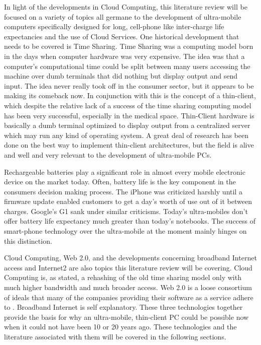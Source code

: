 \documentclass[12pt,oneside,letterpaper,titlepage]{report}
\begin{document}
In light of the developments in Cloud Computing, this literature review will be
focused on a variety of topics all germane to the development of ultra-mobile
computers specifically designed for long, cell-phone like inter-charge life
expectancies and the use of Cloud Services.  One historical development that
needs to be covered is Time Sharing.  Time Sharing was a computing model born in
the days when computer hardware was very expensive.  The idea was that a
computer's computational time could be split between many users accessing the
machine over dumb terminals that did nothing but display output and send input.
The idea never really took off in the consumer sector, but it appears to be
making its comeback now.  In conjunction with this is the concept of a
thin-client, which despite the relative lack of a success of the time sharing
computing model has been very successful, especially in the medical space.
Thin-Client hardware is basically a dumb terminal optimized to display output
from a centralized server which may run any kind of operating system.  A great
deal of research has been done on the best way to implement thin-client
architectures, but the field is alive and well and very relevant to the
development of ultra-mobile PCs.

Rechargeable batteries play a significant role in almost every mobile electronic
device on the market today.  Often, battery life is the key component in the
consumers decision making process.  The iPhone was criticized harshly until a
firmware update enabled customers to get a day's worth of use out of it between
charges.  Google's G1 sank under similar criticisms.  Today's ultra-mobiles
don't offer battery life expectancy much greater than today's notebooks.  The
success of smart-phone technology over the ultra-mobile at the moment mainly
hinges on this distinction.

Cloud Computing, Web 2.0, and the developments concerning broadband Internet
access and Internet2 are also topics this literature review will be covering.
Cloud Computing is, as stated, a rehashing of the old time sharing model only
with much higher bandwidth and much broader access.  Web 2.0 is a loose
consortium of ideals that many of the companies providing their software as a
service adhere to \citep{oreilly2007}.  Broadband Internet is self explanatory.
These three technologies together provide the basis for why an ultra-mobile,
thin-client PC could be possible now when it could not have been 10 or 20 years
ago.  These technologies and the literature associated with them will be covered
in the following sections.
\end{document}
